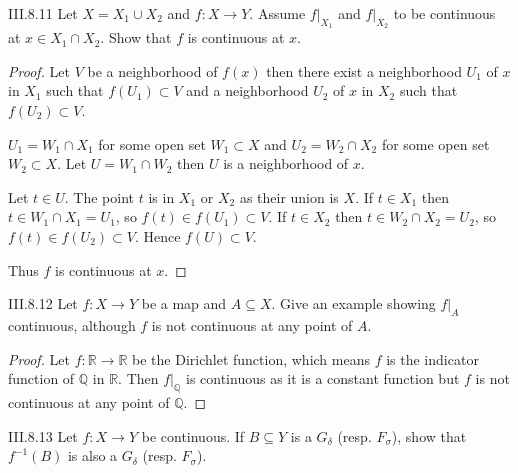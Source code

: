 \begin{problem}{III.8.11}
Let \( X = X_{1} \cup X_{2} \) and \( f: X \to Y \). Assume \( f\vert_{X_{1}} \) and \( f\vert_{X_{2}} \) to be continuous at \( x \in X_{1} \cap X_{2} \). Show that \( f \) is continuous at \( x \).
\end{problem}

\begin{proof}
    Let \( V \) be a neighborhood of \( f(x) \) then there exist a neighborhood \( U_{1} \) of \( x \) in \( X_{1} \) such that \( f(U_{1}) \subset V \) and a neighborhood \( U_{2} \) of \( x \) in \( X_{2} \) such that \( f(U_{2}) \subset V \).

    \( U_{1} = W_{1} \cap X_{1} \) for some open set \( W_{1} \subset X \) and \( U_{2} = W_{2} \cap X_{2} \) for some open set \( W_{2} \subset X \). Let \( U = W_{1} \cap W_{2} \) then \( U \) is a neighborhood of \( x \).

    Let \( t \in U \). The point \( t \) is in \( X_{1} \) or \( X_{2} \) as their union is \( X \). If \( t \in X_{1} \) then \( t \in W_{1} \cap X_{1} = U_{1} \), so \( f(t) \in f(U_{1}) \subset V \). If \( t \in X_{2} \) then \( t \in W_{2} \cap X_{2} = U_{2} \), so \( f(t) \in f(U_{2}) \subset V \). Hence \( f(U) \subset V \).

    Thus \( f \) is continuous at \( x \).
\end{proof}

\begin{problem}{III.8.12}
Let \( f: X \to Y \) be a map and \( A \subseteq X \). Give an example showing \( f\vert_{A} \) continuous, although \( f \) is not continuous at any point of \( A \).
\end{problem}

\begin{proof}
    Let \( f: \mathbb{R} \to \mathbb{R} \) be the Dirichlet function, which means \( f \) is the indicator function of \( \mathbb{Q} \) in \( \mathbb{R} \). Then \( f\vert_{\mathbb{Q}} \) is continuous as it is a constant function but \( f \) is not continuous at any point of \( \mathbb{Q} \).
\end{proof}

\begin{problem}{III.8.13}
Let \( f: X \to Y \) be continuous. If \( B \subseteq Y \) is a \( G_{\delta} \) (resp. \( F_{\sigma} \)), show that \( f^{-1}(B) \) is also a \( G_{\delta} \) (resp. \( F_{\sigma} \)).
\end{problem}

